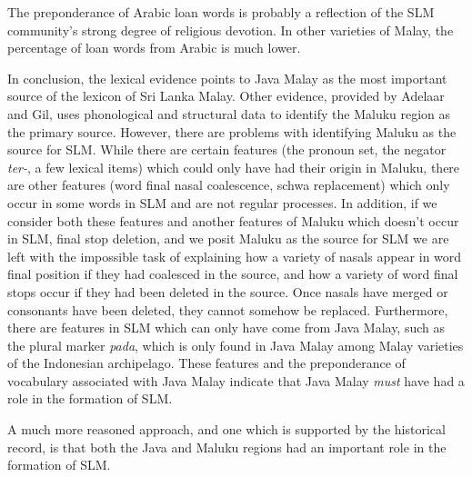 The preponderance of Arabic loan words is probably a reflection of the SLM community's strong degree of religious devotion. In other varieties of Malay, the percentage of loan words from Arabic is much lower.

In conclusion, the lexical evidence points to Java Malay as the most important source of the lexicon of Sri Lanka Malay. Other evidence, provided by Adelaar and Gil, uses phonological and structural data to identify the Maluku region as the primary source. However, there are problems with identifying Maluku as the source for SLM. While there are certain features (the pronoun set, the negator \textit{ter-}, a few lexical items) which could only have had their origin in Maluku, there are other features (word final nasal coalescence, schwa replacement) which only occur in some words in SLM and are not regular processes. In addition, if we consider both these features and another features of Maluku which doesn't occur in SLM, final stop deletion, and we posit Maluku as the source for SLM we are left with the impossible task of explaining how a variety of nasals appear in word final position if they had coalesced in the source, and how a variety of word final stops occur if they had been deleted in the source. Once nasals have merged or consonants have been deleted, they cannot somehow be replaced. Furthermore, there are features in SLM which can only have come from Java Malay, such as the plural marker \textit{pada}, which is only found in Java Malay among Malay varieties of the Indonesian archipelago. These features and the preponderance of vocabulary associated with Java Malay indicate that Java Malay \textit{must} have had a role in the formation of SLM. 

A much more reasoned approach, and one which is supported by the historical record, is that both the Java and Maluku regions had an important role in the formation of SLM. 
